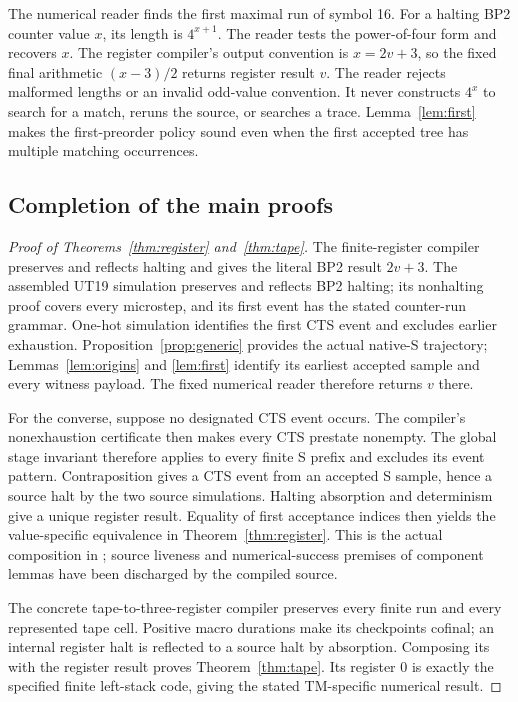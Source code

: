 The numerical reader finds the first maximal run of symbol 16. For a halting
BP2 counter value $x$, its length is $4^{x+1}$. The reader tests the power-of-four
form and recovers $x$. The register compiler's output convention is $x=2v+3$,
so the fixed final arithmetic $(x-3)/2$ returns register result $v$. The reader
rejects malformed lengths or an invalid odd-value convention. It never
constructs $4^x$ to search for a match, reruns the source, or searches a trace.
Lemma~\ref{lem:first} makes the first-preorder policy sound even when the first
accepted tree has multiple matching occurrences.

\subsection{Completion of the main proofs}
\begin{proof}[Proof of Theorems~\ref{thm:register} and~\ref{thm:tape}]
The finite-register compiler preserves and reflects halting and gives the
literal BP2 result $2v+3$. The assembled UT19 simulation preserves and reflects
BP2 halting; its nonhalting proof covers every microstep, and its first event
has the stated counter-run grammar. One-hot simulation identifies the first
CTS event and excludes earlier exhaustion. Proposition~\ref{prop:generic}
provides the actual native-S trajectory; Lemmas~\ref{lem:origins} and
\ref{lem:first} identify its earliest accepted sample and every witness payload.
The fixed numerical reader therefore returns $v$ there.

For the converse, suppose no designated CTS event occurs. The compiler's
nonexhaustion certificate then makes every CTS prestate nonempty.
The global stage invariant therefore applies to every finite S prefix and
excludes its event pattern. Contraposition gives a CTS event from an accepted
S sample, hence a source halt by the two source simulations. Halting
absorption and determinism give a unique register result. Equality of first
acceptance indices then yields the value-specific equivalence in
Theorem~\ref{thm:register}. This is the actual composition in
; source liveness and numerical-success premises of
component lemmas have been discharged by the compiled source.

The concrete tape-to-three-register compiler preserves every finite run
and every represented tape cell. Positive macro durations make its checkpoints cofinal; an internal
register halt is reflected to a source halt by absorption. Composing its
 with the register result proves
Theorem~\ref{thm:tape}. Its register 0 is exactly the specified finite left-stack
code, giving the stated TM-specific numerical result.
\end{proof}

